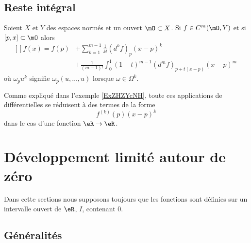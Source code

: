 \subsection{Reste intégral}

\begin{proposition}\label{PropAXaSClx}
    Soient \( X\) et \( Y\) des espaces normés et un ouvert \( \mO\subset X\). Si \( f\in C^m(\mO,Y)\) et si \( [p,x]\subset \mO\) alors
    \begin{equation}
        \begin{aligned}[]
            f(x)=f(p)&+\sum_{k=1}^{m-1}\frac{1}{ k! }(d^kf)_p (x-p)^k \\
            &+\frac{1}{ (m-1)! }\int_0^1(1-t)^{m-1}(d^mf)_{ p+t(x-p) }(x-p)^m \
        \end{aligned}
    \end{equation}
    où \( \omega_pu^k\) signifie \( \omega_p(u,\ldots, u)\) lorsque \( \omega\in \Omega^k\).
\end{proposition}
Comme expliqué dans l'exemple \ref{ExZHZYcNH}, toute ces applications de différentielles se réduisent à des termes de la forme
\begin{equation}
    f^{(k)}(p)(x-p)^k
\end{equation}
dans le cas d'une fonction \( \eR\to\eR\).

\section{Développement limité autour de zéro}

Dans cette sections nous supposons toujours que les fonctions sont définies sur un intervalle ouvert de $\eR$, $I$, contenant \( 0\).

\subsection{Généralités}

